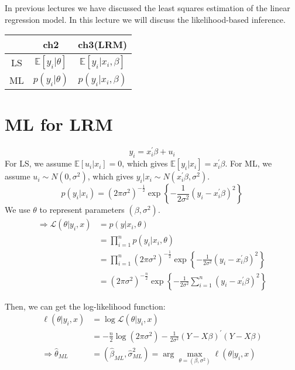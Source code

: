 In previous lectures we have discussed the least squares estimation of the linear regression model. In this lecture we will discuss the likelihood-based inference.
\begin{table}[h!]
    \centering
    \begin{tabular}{c|c|c}
        \hline
         & ch2 & ch3(LRM) \\
        \hline
        LS & $\mathbb{E}[y_i|\theta]$ & $\mathbb{E}[y_i|x_i, \beta]$ \\
        ML & $p(y_i | \theta )$ & $p(y_i|x_i, \beta )$ \\
        \hline
    \end{tabular}
\end{table}

\section{ML for LRM}
\[y_i = x^{\prime} _i \beta + u_i\]
For LS, we assume $\mathbb{E}[u_i|x_i] = 0$, which gives $\mathbb{E}[y_i|x_i] = x^{\prime} _i \beta.$
For ML, we assume $u_i \sim N(0, \sigma^2)$, which gives $y_i|x_i \sim N(x^{\prime} _i \beta, \sigma^2).$
\[
p(y_i|x_i) = (2\pi \sigma^2)^{-\frac{1}{2}} \exp\left\{ -\frac{1}{2 \sigma ^2} (y_i - x^{\prime} _i \beta )^2\right\}
\]
We use $\theta $ to represent parameters $(\beta, \sigma^2).$
\begin{align*}
    \Rightarrow \mathcal{L}(\theta |y_i, x) &= p(y | x_i, \theta ) \\
    &= \prod_{i=1}^{n}p(y_i|x_i,\theta )\\
    &= \prod_{i=1}^{n} (2\pi \sigma^2)^{-\frac{1}{2}} \exp\left\{ -\frac{1}{2 \sigma ^2} (y_i - x^{\prime} _i \beta )^2\right\}\\
    &= (2\pi \sigma^2)^{-\frac{n}{2}} \exp\left\{ -\frac{1}{2 \sigma ^2} \sum_{i=1}^{n}(y_i - x^{\prime} _i \beta )^2\right\}
\end{align*}

Then, we can get the log-likelihood function:
\begin{align*}
    \ell(\theta |y_i, x) &= \log \mathcal{L}(\theta |y_i, x)\\
    &= -\frac{n}{2} \log (2\pi \sigma^2) - \frac{1}{2 \sigma ^2} (Y - X\beta )^{\prime} (Y - X\beta )\\
    \Rightarrow \hat{\theta }_{ML} &= (\hat{\beta}_{ML}, \hat{\sigma}^2_{ML}) = \arg\max_{\theta=(\beta, \sigma^2) } \ell(\theta |y_i, x)
\end{align*}


